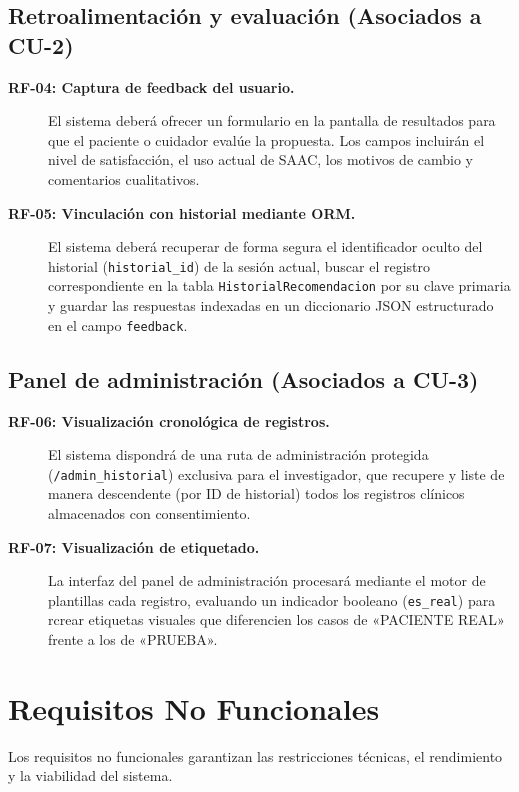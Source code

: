 \subsection{Retroalimentación y evaluación (Asociados a CU-2)}
\begin{description}
	\item[\textbf{RF-04: Captura de feedback del usuario.}] El sistema deberá ofrecer un formulario en la pantalla de resultados para que el paciente o cuidador evalúe la propuesta. Los campos incluirán el nivel de satisfacción, el uso actual de SAAC, los motivos de cambio y 				comentarios cualitativos.
	\item[\textbf{RF-05: Vinculación con historial mediante ORM.}] El sistema deberá recuperar de forma segura el identificador oculto del historial (\texttt{historial\_id}) de la sesión actual, buscar el registro correspondiente en la tabla \texttt{HistorialRecomendacion} por su clave 			primaria y guardar las respuestas indexadas en un diccionario JSON estructurado en el campo \texttt{feedback}.
\end{description}

\subsection{Panel de administración (Asociados a CU-3)}
\begin{description}
	\item[\textbf{RF-06: Visualización cronológica de registros.}] El sistema dispondrá de una ruta de administración protegida (\texttt{/admin\_historial}) exclusiva para el investigador, que recupere y liste de manera descendente (por ID de historial) todos los registros clínicos 				almacenados con consentimiento.
	\item[\textbf{RF-07: Visualización de etiquetado.}] La interfaz del panel de administración procesará mediante el motor de plantillas cada registro, evaluando un indicador booleano (\texttt{es\_real}) para rcrear etiquetas visuales que diferencien los casos de «PACIENTE REAL» frente a los de «PRUEBA».
\end{description}

\section{Requisitos No Funcionales}
Los requisitos no funcionales garantizan las restricciones técnicas, el rendimiento y la viabilidad del sistema.

